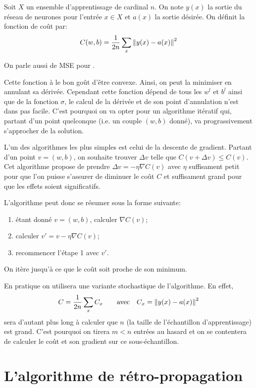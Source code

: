\begin{definition}
Soit $X$ un ensemble d'apprentissage de cardinal $n$. 
On note $y(x)$ la sortie du réseau de neurones pour l'entrée $x \in X$ et 
$a(x)$ la sortie désirée. On définit la fonction de coût par:
\[
C(w, b) = \frac{1}{2n} \sum_{x} \left\Vert y(x) - a(x)\right\Vert^2
\]
\end{definition}

On parle aussi de \textsc{MSE} pour .

Cette fonction à le bon goût d'être convexe. Ainsi, on peut la minimiser en annulant 
sa dérivée. 
Cependant cette fonction dépend de tous les $w^{l}$ et $b^{l}$ ainsi que de la fonction 
$\sigma$, le calcul de la dérivée et de son point d'annulation n'est dans pas facile.
C'est pourquoi on va opter pour un algorithme itératif qui, partant d'un point quelconque 
(i.e.\/ un couple $(w,b)$ donné), va prograssivement s'approcher de la solution. 

L'un des algorithmes les plus simples est celui de la descente de gradient.
Partant d'un point $v = (w,b)$, on souhaite trouver $\Delta v$ telle que 
$C(v + \Delta v) \leq C(v)$. Cet algorithme propose de prendre 
$\Delta v = -\eta\nabla C(v)$ avec $\eta$ suffisament petit pour que 
l'on puisse s'assurer de diminuer le coût $C$ et suffisament grand pour que les 
effets soient significatifs.

L'algorithme peut donc se résumer sous la forme suivante:
\begin{enumerate}
  \item étant donné $v = (w, b)$, calculer $\nabla C(v)$;
  \item calculer $v' = v - \eta \nabla C(v)$;
  \item recommencer l'étape 1 avec $v'$.
\end{enumerate}
On itère jusqu'à ce que le coût soit proche de son minimum.

En pratique on utilisera une variante stochastique de l'algorithme. 
En effet, 
\[
C = \frac{1}{2n} \sum_{x} C_x \qquad \text{avec} \quad C_x = \left\Vert y(x) - a(x)\right\Vert^2
\]
sera d'autant plus long à calculer que $n$ (la taille de l'échantillon d'apprentissage) 
est grand.
C'est pourquoi on tirera $m < n$ entrées au hasard et on se contentera de calculer 
le coût et son gradient sur ce sous-échantillon.



\section{L'algorithme de rétro-propagation}


